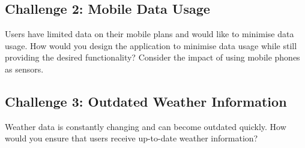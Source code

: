 \documentclass{csse4400}
\begin{document}
\subsection*{Challenge 2: Mobile Data Usage}
Users have limited data on their mobile plans and would like to minimise data usage.
How would you design the application to minimise data usage while still providing the desired functionality?
Consider the impact of using mobile phones as sensors.

\subsection*{Challenge 3: Outdated Weather Information}
Weather data is constantly changing and can become outdated quickly.
How would you ensure that users receive up-to-date weather information?
\end{document}
